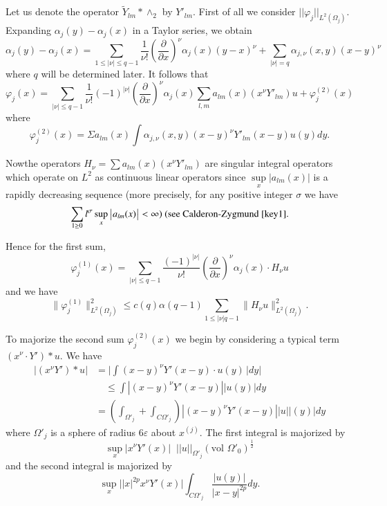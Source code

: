  Let us denote the operator $\tilde{Y}_{lm}* \wedge_2$ by
 $Y'_{lm}$. First of all we consider $||\varphi_j||_{L^2
   (\Omega_j)}$. Expanding $\alpha_j (y) - \alpha_j (x) $ in a Taylor
 series, we obtain  
\begin{equation}
\alpha_j (y) - \alpha_j (x) = \sum\limits_{1\leq | \nu | \leq q-1}\frac{1}{\nu!}
\left(\frac{\partial}{\partial x} \right)^\nu \alpha_j (x) (y-x)^\nu +
\sum\limits_{|\nu | = q } \alpha_{j,\nu} (x, y) (x-y)^\nu
\tag{5.9}\label{chap3-eq5.9}   
\end{equation} 
 where $q$ will be determined later. It follows that 
 $$
 \varphi_j (x) = \sum\limits_{|\nu| \leq q-1} \frac{1}{\nu !}
 (-1)^{|\nu|} (\frac{\partial}{\partial x})^\nu \alpha_j (x) \sum
 \limits_{l,m } a_{lm}(x) (x^\nu Y'_{lm} ) u + \varphi^{(2)}_j (x)  
 $$
where 
 \begin{equation}
\varphi _j^{(2)} (x) = \Sigma a_{lm}(x) \int \alpha_{j ,\nu}
(x,y)(x-y)^\nu Y'_{lm} (x-y) u (y) dy. \tag{5.10} \label{chap3-eq5.10}
 \end{equation} 

Now\pageoriginale the operators $H_\nu = \sum a_{lm} (x) (x^\nu
 Y'_{lm}) $ are 
 singular integral operators which operate on $L^2$  as continuous
 linear operators since $ \sup\limits_{x}| a_{lm }(x) | $ is a rapidly
 decreasing sequence (more precisely, for any positive integer
 $\sigma$ we have  
 $$
 \sum\limits_{1 \geq 0 } l^\sigma \sup\limits_{x} \big|a_{lm}(x) \big| <
 \infty) \text{ (see Calderon-Zygmund  \cite{key1}.}  
 $$

Hence for the first sum, 
 \begin{equation}
\varphi^{(1)}_j (x) = \sum\limits_{|\nu | \leq q-1}
\frac{(-1)^{|\nu|}}{\nu !} (\frac{\partial }{\partial x})^\nu \alpha_j
(x) \cdot H_\nu u \tag{5.11} \label{chap3-eq5.11} 
 \end{equation} 
 and we have 
 \begin{equation}
\big\| \varphi^{(1)}_j \big\|^2_{L^2 (\Omega_j )} \leq c (q) \alpha
(q-1) \sum\limits_{1 \leq | \nu | q-1} \big\| H_\nu u
\big\|^2_{L^2(\Omega_j )}. \tag {5.12}  \label{chap3-eq5.12}
 \end{equation} 

 To majorize the second sum $\varphi^{(2)}_j (x)$  we begin by
 considering a typical term $(x^\nu \cdot Y')* u$. We have 
 \begin{align*}
 |(x^\nu Y') * u | &  = \big| \int (x-y)^\nu Y' (x-y) \cdot u (y) \,
 | dy \big|\\
&\quad \leq \int |(x-y)^\nu Y' (x-y) || u(y) | dy \\ 
 & = \left(\int_{\Omega'_j }+ \int_{C\Omega'_j}\right) | (x-y)^\nu Y' (x-y) || u
 || (y) | dy 
 \end{align*} 
 where $\Omega'_j$ is a sphere of radius $6 \varepsilon$ about
 $x^{(j)}$. The first integral is majorized by  
$$
 \sup\limits_{x} |x^\nu Y' (x) |\;\; || u||_{\Omega'_j}(\text{vol
 }\Omega'_0)^{\frac{1}{2}}  
$$
and the second integral is majorized by 
 $$
 \sup\limits_{x}\big| |x|^{2p} x^\nu Y' (x) \big| \int_{C\Omega'_j}
 \frac{|u(y)|}{|x-y|^{2p}} dy .  
 $$

